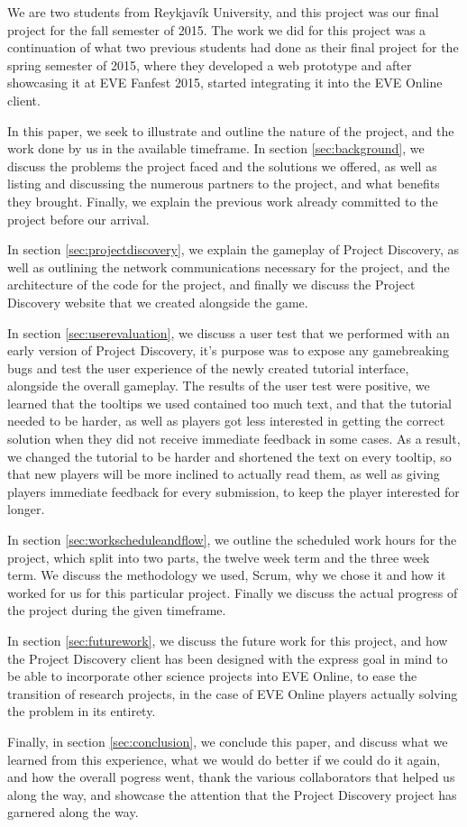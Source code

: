 We are two students from Reykjavík University, and this project was our final project for the fall semester of 2015. The work we did for this project was a continuation of what two previous students had done as their final project for the spring semester of 2015, where they developed a web prototype and after showcasing it at EVE Fanfest 2015, started integrating it into the EVE Online client. 

In this paper, we seek to illustrate and outline the nature of the project, and the work done by us in the available timeframe. In section \ref{sec:background}, we discuss the problems the project faced and the solutions we offered, as well as listing and discussing the numerous partners to the project, and what benefits they brought. Finally, we explain the previous work already committed to the project before our arrival.

In section \ref{sec:projectdiscovery}, we explain the gameplay of Project Discovery, as well as outlining the network communications necessary for the project, and the architecture of the code for the project, and finally we discuss the Project Discovery website that we created alongside the game. 

In section \ref{sec:userevaluation}, we discuss a user test that we performed with an early version of Project Discovery, it's purpose was to expose any gamebreaking bugs and test the user experience of the newly created tutorial interface, alongside the overall gameplay. The results of the user test were positive, we learned that the tooltips we used contained too much text, and that the tutorial needed to be harder, as well as players got less interested in getting the correct solution when they did not receive immediate feedback in some cases. As a result, we changed the tutorial to be harder and shortened the text on every tooltip, so that new players will be more inclined to actually read them, as well as giving players immediate feedback for every submission, to keep the player interested for longer.

In section \ref{sec:workscheduleandflow}, we outline the scheduled work hours for the project, which split into two parts, the twelve week term and the three week term. We discuss the methodology we used, Scrum, why we chose it and how it worked for us for this particular project. Finally we discuss the actual progress of the project during the given timeframe.

In section \ref{sec:futurework}, we discuss the future work for this project, and how the Project Discovery client has been designed with the express goal in mind to be able to incorporate other science projects into EVE Online, to ease the transition of research projects, in the case of EVE Online players actually solving the problem in its entirety.

Finally, in section \ref{sec:conclusion}, we conclude this paper, and discuss what we learned from this experience, what we would do better if we could do it again, and how the overall pogress went, thank the various collaborators that helped us along the way, and showcase the attention that the Project Discovery project has garnered along the way.